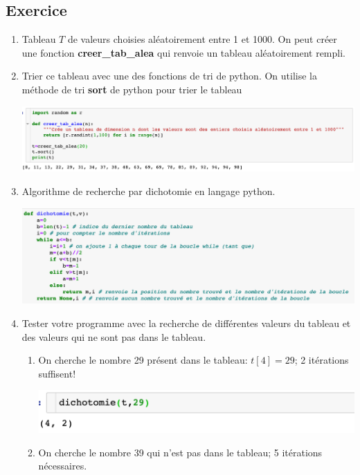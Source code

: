 \documentclass[11pt,a4paper]{article}
\newcounter{num}
\newcounter{rem}
\newcounter{numexo}
\begin{document}
\subsection*{\Large Exercice \thenumexo}
\begin{enumerate}
\item Tableau $T$ de valeurs choisies aléatoirement entre 1 et 1000.
On peut créer une fonction \textbf{creer\_tab\_alea} qui renvoie un tableau aléatoirement rempli.
\item Trier ce tableau avec une des fonctions de tri de python.
On utilise la méthode de tri \textbf{sort} de python pour trier le tableau
\begin{center}
\includegraphics[scale=0.5]{../img/Ex-dicho-3-1.png}
\end{center}
\item Algorithme de recherche par dichotomie en langage python.
\begin{center}
\includegraphics[scale=0.57]{../img/Ex-dicho-3-2.png}
\end{center}
\item Tester votre programme avec la recherche de différentes valeurs du tableau et des valeurs qui ne sont pas dans le tableau.
\begin{enumerate}
\item On cherche le nombre 29 présent dans le tableau: $t[4]=29$; 2 itérations suffisent!
\begin{center}
\includegraphics[scale=0.55]{../img/Ex-dicho-3-3.png}
\end{center}
\item On cherche le nombre 39 qui n'est pas dans le tableau; 5 itérations nécessaires.

\end{enumerate}
\end{enumerate}
\end{document}
